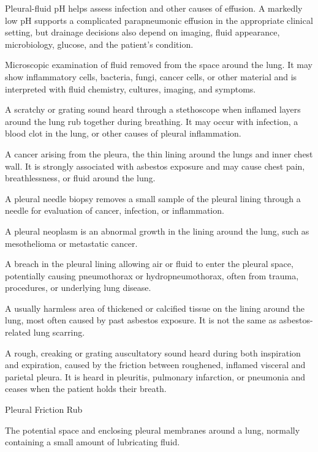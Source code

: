  Pleural-fluid pH helps assess infection and other causes of effusion. A markedly low pH supports a
complicated parapneumonic effusion in the appropriate clinical setting, but drainage decisions
also depend on imaging, fluid appearance, microbiology, glucose, and the patient's condition.

 Microscopic examination of fluid removed from the space around the lung. It may show inflammatory cells, bacteria, fungi, cancer cells, or other material and is interpreted with fluid chemistry, cultures, imaging, and symptoms.

 A scratchy or grating sound heard through a stethoscope when inflamed layers around the lung rub together during breathing. It may occur with infection, a blood clot in the lung, or other causes of pleural inflammation.

 A cancer arising from the pleura, the thin lining around the lungs and inner chest wall. It is strongly associated with asbestos exposure and may cause chest pain, breathlessness, or fluid around the lung.

 A pleural needle biopsy removes a small sample of the pleural lining through a needle for evaluation of cancer, infection, or inflammation.

 A pleural neoplasm is an abnormal growth in the lining around the lung, such as mesothelioma or metastatic cancer.

 A breach in the pleural lining allowing air or fluid to enter the pleural space,
potentially causing pneumothorax or hydropneumothorax, often from trauma, procedures, or
underlying lung disease.

 A usually harmless area of thickened or calcified tissue on the lining around the lung, most often caused by past asbestos exposure. It is not the same as asbestos-related lung scarring.

 A rough, creaking or grating auscultatory sound heard during both inspiration and expiration, caused by the friction between roughened, inflamed visceral and parietal pleura. It is heard in pleuritis, pulmonary infarction, or pneumonia and ceases when the patient holds their breath.

\synonyms
Pleural Friction Rub

 The potential space and enclosing pleural membranes around a lung, normally containing a small amount of lubricating fluid.

